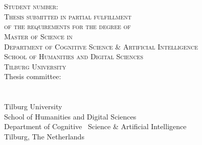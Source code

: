 \thispagestyle{empty}

\begin{center}
\huge{\textbf{\thesistitle{}}} \\[1.2cm]
\normalsize{\yourname{}} \\
\normalsize{\textsc{Student number}: \yourstudentnumber{}} \\ [1cm]
\normalsize{\textsc{Thesis submitted in partial fulfillment}} \\
\normalsize{\textsc{of the requirements for the degree of}} \\
\normalsize{\textsc{Master of Science in \yourprogramme{}}}\\
\normalsize{\textsc{Department of Cognitive Science \& Artificial Intelligence}} \\
\normalsize{\textsc{School of Humanities and Digital Sciences}} \\
\normalsize{\textsc{Tilburg University}} \\ [1.5cm]
\normalsize{Thesis committee:} \\[0.2cm]
\normalsize{\supervisor{}} \\
\normalsize{\committee{}} \\
\vfill
\normalsize{Tilburg University} \\
\normalsize{School of Humanities and Digital Sciences} \\
\normalsize{Department of Cognitive \ Science \& Artificial Intelligence} \\
\normalsize{Tilburg, The Netherlands} \\
\normalsize{\finalmonth{} \finalyear{}} \\
\end{center}

\newpage \thispagestyle{empty} \strut
\newpage \thispagestyle{empty}